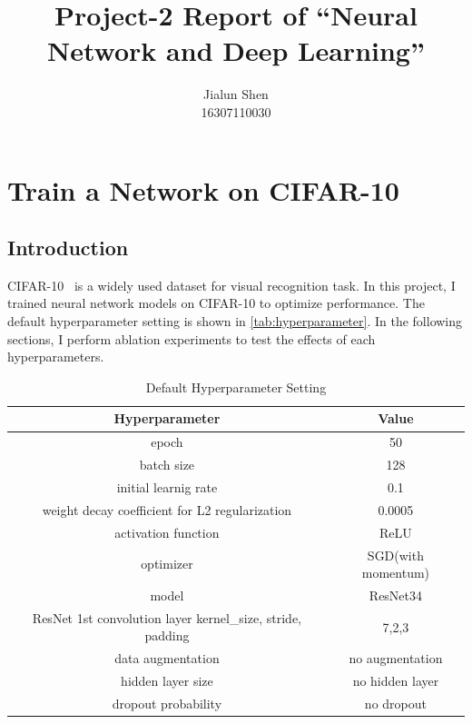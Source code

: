 \documentclass[10pt]{article}
\title{Project-2 Report of ``Neural Network and Deep Learning''}
\author{Jialun Shen\\ 16307110030}
\date{}
\begin{document}
\maketitle
\section{Train a Network on CIFAR-10}

\subsection{Introduction}

CIFAR-10~\citep{krizhevsky2009learning} is a widely used dataset for visual recognition task. 
In this project, I trained neural network models on CIFAR-10 to optimize performance. 
The default hyperparameter setting is shown in \autoref{tab:hyperparameter}.
In the following sections, I perform ablation experiments to test the effects of each hyperparameters.

\begin{table}[htb]
\centering
\caption{Default Hyperparameter Setting}
\begin{tabular}{c|c}
\hline
\textbf{Hyperparameter}   & \textbf{Value}      \\ \hline
epoch     & 50         \\
batch size   & 128         \\
initial learnig rate       & 0.1            \\
weight decay coefficient for L2 regularization      & 0.0005            \\
activation function        & ReLU        \\
optimizer  & SGD(with momentum)  \\
model & ResNet34 \\
ResNet 1st convolution layer kernel\_size, stride, padding & 7,2,3 \\
data augmentation  & no augmentation  \\
hidden layer size & no hidden layer \\ 
dropout probability & no dropout \\
\hline
\end{tabular}
\label{tab:hyperparameter}
\end{table}
\end{document}
